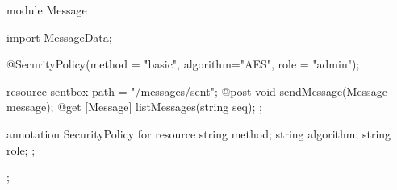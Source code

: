 module  Message {
 import MessageData; 

 @SecurityPolicy(method = "basic", 
                 algorithm="AES", 
                 role = "admin");
                 
 resource sentbox { 
  path = "/messages/sent";
  @post void sendMessage(Message message); 
  @get [Message] listMessages(string seq); 
 };
 
 annotation SecurityPolicy for resource {
   string method;
   string algorithm;
   string role;
 };
 
};
